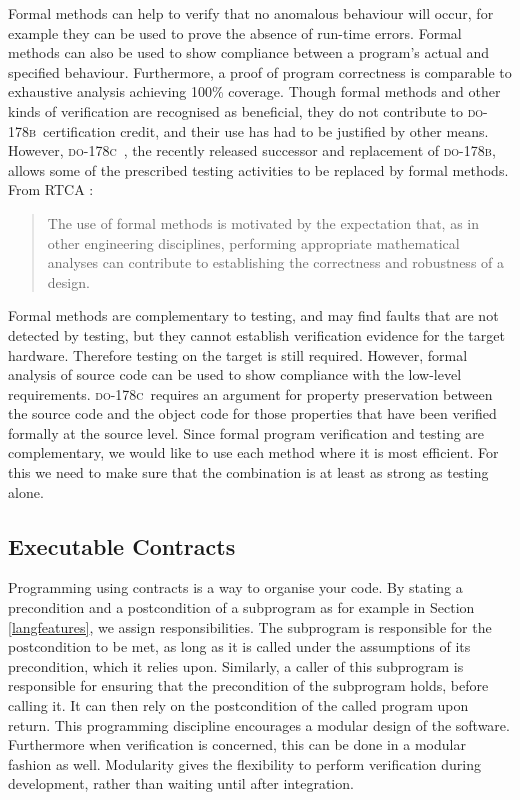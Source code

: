 \documentclass[sttt,final]{svjour}
\newcommand{\DOB}{\textsc{do-178b}}
\newcommand{\DOC}{\textsc{do-178c}}
\begin{document}
Formal methods can help to verify that no anomalous behaviour will
occur, for example they can be used to prove the absence of run-time
errors. Formal methods can also be used to show compliance between a
program's actual and specified behaviour. Furthermore, a proof of
program correctness is comparable to exhaustive analysis achieving
100\% coverage. Though formal methods and other kinds of verification
are recognised as beneficial, they do not contribute to \DOB\
certification credit, and their use has had to be justified by other
means. However, \DOC\ \cite{do178c}, the recently released successor and
replacement of \DOB, allows some of the prescribed testing
activities to be replaced by formal methods. From RTCA \cite{do178c}:
%
\begin{quote}
  The use of formal methods is motivated by the expectation that, as
  in other engineering disciplines, performing appropriate
  mathematical analyses can contribute to establishing the correctness
  and robustness of a design.
\end{quote}
%
Formal methods are complementary to testing, and may find faults that
are not detected by testing, but they cannot establish verification
evidence for the target hardware. Therefore testing on the target is
still required. However, formal analysis of source code can be used to
show compliance with the low-level requirements. \DOC\ requires an
argument for property preservation between the source code and the
object code for those properties that have been verified formally at
the source level. Since formal program verification and testing are
complementary, we would like to use each method where it is most
efficient. For this we need to make sure that the combination is at
least as strong as testing alone.

\subsection{Executable Contracts}
Programming using contracts is a way to organise your code. By stating
a precondition and a postcondition of a subprogram as for example in
Section \ref{langfeatures}, we assign responsibilities. The subprogram
is responsible for the postcondition to be met, as long as it is
called under the assumptions of its precondition, which it relies
upon. Similarly, a caller of this subprogram is responsible for ensuring that
the precondition of the subprogram holds, before calling it. It can
then rely on the postcondition of the called program upon return. This
programming discipline encourages a modular design of the
software. Furthermore when verification is concerned, this can be done
in a modular fashion as well. Modularity gives the flexibility to
perform verification during development, rather than waiting until
after integration.
\end{document}
